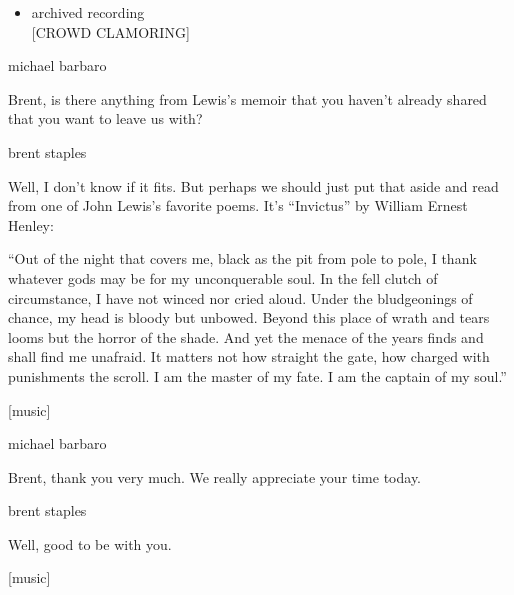 \begin{itemize}
\tightlist
\item
  archived recording\\
  {[}CROWD CLAMORING{]}
\end{itemize}

michael barbaro

Brent, is there anything from Lewis's memoir that you haven't already
shared that you want to leave us with?

brent staples

Well, I don't know if it fits. But perhaps we should just put that aside
and read from one of John Lewis's favorite poems. It's ``Invictus'' by
William Ernest Henley:

``Out of the night that covers me, black as the pit from pole to pole, I
thank whatever gods may be for my unconquerable soul. In the fell clutch
of circumstance, I have not winced nor cried aloud. Under the
bludgeonings of chance, my head is bloody but unbowed. Beyond this place
of wrath and tears looms but the horror of the shade. And yet the menace
of the years finds and shall find me unafraid. It matters not how
straight the gate, how charged with punishments the scroll. I am the
master of my fate. I am the captain of my soul.''

{[}music{]}

michael barbaro

Brent, thank you very much. We really appreciate your time today.

brent staples

Well, good to be with you.

{[}music{]}

